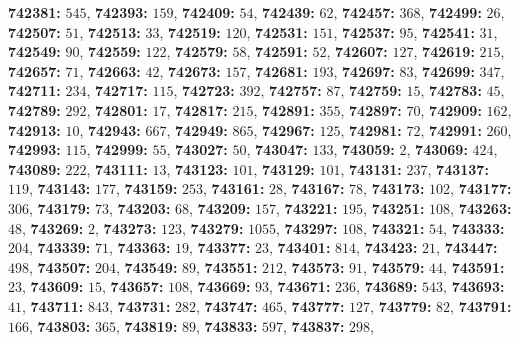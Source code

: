 \textsf{\bfseries 742381:} $545$, \textsf{\bfseries 742393:} $159$, \textsf{\bfseries 742409:} $54$, \textsf{\bfseries 742439:} $62$, \textsf{\bfseries 742457:} $368$, \textsf{\bfseries 742499:} $26$, \textsf{\bfseries 742507:} $51$, \textsf{\bfseries 742513:} $33$, \textsf{\bfseries 742519:} $120$, \textsf{\bfseries 742531:} $151$, \textsf{\bfseries 742537:} $95$, \textsf{\bfseries 742541:} $31$, \textsf{\bfseries 742549:} $90$, \textsf{\bfseries 742559:} $122$, \textsf{\bfseries 742579:} $58$, \textsf{\bfseries 742591:} $52$, \textsf{\bfseries 742607:} $127$, \textsf{\bfseries 742619:} $215$, \textsf{\bfseries 742657:} $71$, \textsf{\bfseries 742663:} $42$, \textsf{\bfseries 742673:} $157$, \textsf{\bfseries 742681:} $193$, \textsf{\bfseries 742697:} $83$, \textsf{\bfseries 742699:} $347$, \textsf{\bfseries 742711:} $234$, \textsf{\bfseries 742717:} $115$, \textsf{\bfseries 742723:} $392$, \textsf{\bfseries 742757:} $87$, \textsf{\bfseries 742759:} $15$, \textsf{\bfseries 742783:} $45$, \textsf{\bfseries 742789:} $292$, \textsf{\bfseries 742801:} $17$, \textsf{\bfseries 742817:} $215$, \textsf{\bfseries 742891:} $355$, \textsf{\bfseries 742897:} $70$, \textsf{\bfseries 742909:} $162$, \textsf{\bfseries 742913:} $10$, \textsf{\bfseries 742943:} $667$, \textsf{\bfseries 742949:} $865$, \textsf{\bfseries 742967:} $125$, \textsf{\bfseries 742981:} $72$, \textsf{\bfseries 742991:} $260$, \textsf{\bfseries 742993:} $115$, \textsf{\bfseries 742999:} $55$, \textsf{\bfseries 743027:} $50$, \textsf{\bfseries 743047:} $133$, \textsf{\bfseries 743059:} $2$, \textsf{\bfseries 743069:} $424$, \textsf{\bfseries 743089:} $222$, \textsf{\bfseries 743111:} $13$, \textsf{\bfseries 743123:} $101$, \textsf{\bfseries 743129:} $101$, \textsf{\bfseries 743131:} $237$, \textsf{\bfseries 743137:} $119$, \textsf{\bfseries 743143:} $177$, \textsf{\bfseries 743159:} $253$, \textsf{\bfseries 743161:} $28$, \textsf{\bfseries 743167:} $78$, \textsf{\bfseries 743173:} $102$, \textsf{\bfseries 743177:} $306$, \textsf{\bfseries 743179:} $73$, \textsf{\bfseries 743203:} $68$, \textsf{\bfseries 743209:} $157$, \textsf{\bfseries 743221:} $195$, \textsf{\bfseries 743251:} $108$, \textsf{\bfseries 743263:} $48$, \textsf{\bfseries 743269:} $2$, \textsf{\bfseries 743273:} $123$, \textsf{\bfseries 743279:} $1055$, \textsf{\bfseries 743297:} $108$, \textsf{\bfseries 743321:} $54$, \textsf{\bfseries 743333:} $204$, \textsf{\bfseries 743339:} $71$, \textsf{\bfseries 743363:} $19$, \textsf{\bfseries 743377:} $23$, \textsf{\bfseries 743401:} $814$, \textsf{\bfseries 743423:} $21$, \textsf{\bfseries 743447:} $498$, \textsf{\bfseries 743507:} $204$, \textsf{\bfseries 743549:} $89$, \textsf{\bfseries 743551:} $212$, \textsf{\bfseries 743573:} $91$, \textsf{\bfseries 743579:} $44$, \textsf{\bfseries 743591:} $23$, \textsf{\bfseries 743609:} $15$, \textsf{\bfseries 743657:} $108$, \textsf{\bfseries 743669:} $93$, \textsf{\bfseries 743671:} $236$, \textsf{\bfseries 743689:} $543$, \textsf{\bfseries 743693:} $41$, \textsf{\bfseries 743711:} $843$, \textsf{\bfseries 743731:} $282$, \textsf{\bfseries 743747:} $465$, \textsf{\bfseries 743777:} $127$, \textsf{\bfseries 743779:} $82$, \textsf{\bfseries 743791:} $166$, \textsf{\bfseries 743803:} $365$, \textsf{\bfseries 743819:} $89$, \textsf{\bfseries 743833:} $597$, \textsf{\bfseries 743837:} $298$, 
